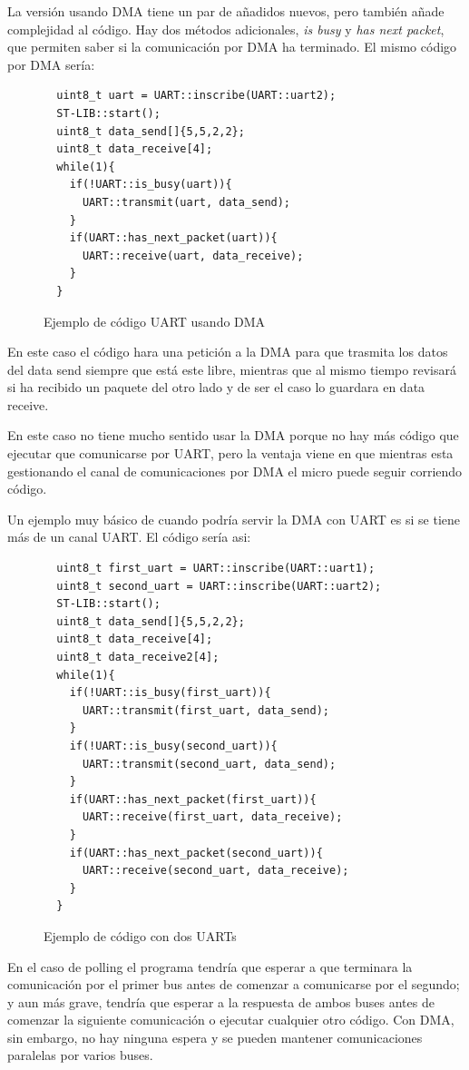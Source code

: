 \documentclass{report}
\begin{document}
\par \vspace{0.3cm}
La versión usando DMA tiene un par de añadidos nuevos, pero también añade complejidad al código. Hay dos métodos adicionales, \textit{is busy} y \textit{has next packet}, que permiten saber si la comunicación por DMA ha terminado. El mismo código por DMA sería: 
\begin{figure}[h]
\begin{lstlisting}
  uint8_t uart = UART::inscribe(UART::uart2);
  ST-LIB::start();
  uint8_t data_send[]{5,5,2,2};
  uint8_t data_receive[4];
  while(1){
    if(!UART::is_busy(uart)){
      UART::transmit(uart, data_send);
    }
    if(UART::has_next_packet(uart)){
      UART::receive(uart, data_receive);
    }
  }
\end{lstlisting}
\caption{Ejemplo de código UART usando DMA}
  \label{UARTwDMAcode}
\end{figure}
\par \vspace{0.3cm}

En este caso el código hara una petición a la DMA para que trasmita los datos del data send siempre que está este libre, mientras que al mismo tiempo revisará si ha recibido un paquete del otro lado y de ser el caso lo guardara en data receive. \par En este caso no tiene mucho sentido usar la DMA porque no hay más código que ejecutar que comunicarse por UART, pero la ventaja viene en que mientras esta gestionando el canal de comunicaciones por DMA el micro puede seguir corriendo código. \par \vspace{0.3cm}
Un ejemplo muy básico de cuando podría servir la DMA con UART es si se tiene más de un canal UART. El código sería asi: 
\begin{figure}[h]
\begin{lstlisting}
  uint8_t first_uart = UART::inscribe(UART::uart1);
  uint8_t second_uart = UART::inscribe(UART::uart2);
  ST-LIB::start();
  uint8_t data_send[]{5,5,2,2};
  uint8_t data_receive[4];
  uint8_t data_receive2[4];
  while(1){
    if(!UART::is_busy(first_uart)){
      UART::transmit(first_uart, data_send);
    }
    if(!UART::is_busy(second_uart)){
      UART::transmit(second_uart, data_send);
    }
    if(UART::has_next_packet(first_uart)){
      UART::receive(first_uart, data_receive);
    }
    if(UART::has_next_packet(second_uart)){
      UART::receive(second_uart, data_receive);
    }
  }
\end{lstlisting}
\caption{Ejemplo de código con dos UARTs}
  \label{twoUARTcode}
\end{figure}
\par \vspace{0.3cm}
En el caso de polling el programa tendría que esperar a que terminara la comunicación por el primer bus antes de comenzar a comunicarse por el segundo; y aun más grave, tendría que esperar a la respuesta de ambos buses antes de comenzar la siguiente comunicación o ejecutar cualquier otro código. Con DMA, sin embargo, no hay ninguna espera y se pueden mantener comunicaciones paralelas por varios buses. 
\end{document}

